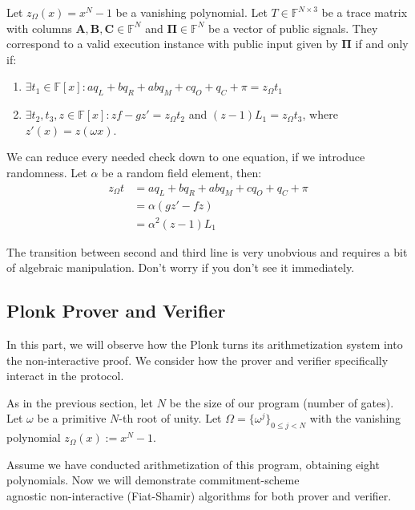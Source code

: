 \documentclass[../lecture-notes.tex]{subfiles}
\begin{document}
\begin{definition}
Let $z_{\Omega}(x) = x^N - 1$ be a vanishing polynomial. Let $T \in \mathbb{F}^{N
\times 3}$ be a trace matrix with columns $\mathbf{A}, \mathbf{B}, \mathbf{C}
\in \mathbb{F}^N$ and $\boldsymbol{\Pi} \in \mathbb{F}^N$ be a vector of public
signals. They correspond to a valid execution instance with public input given
by $\boldsymbol{\Pi}$ if and only if:

\begin{enumerate}
    \item \(\exists t_1 \in \mathbb{F}[x]: aq_L + bq_R + abq_M + cq_O + q_C + \pi = z_{\Omega}t_1\)
    \item \(\exists t_2, t_3, z \in \mathbb{F}[x]: zf - gz' = z_{\Omega}t_2\) and \((z-1)L_1 = z_{\Omega}t_3\), where $z'(x) = z(\omega x)$.
\end{enumerate}
\end{definition}
\begin{remark}
We can reduce every needed check down to one equation, if we introduce randomness.
Let $\alpha$ be a random field element, then: 
\[
    \begin{aligned}
        z_{\Omega}t &= aq_L + bq_R + abq_M + cq_O + q_C + \pi \\
        &= \alpha(gz' - fz) \\
        &= \alpha^2(z - 1)L_1
    \end{aligned}
\]

The transition between second and third line is very unobvious and requires a 
bit of algebraic manipulation. Don't worry if you don't see it immediately.
\end{remark}


\subsection{Plonk Prover and Verifier}

In this part, we will observe how the Plonk turns its arithmetization system
into the non-interactive proof. We consider how the prover and verifier specifically interact
in the protocol.

As in the previous section, let $N$ be the size of our program (number of
gates). Let $\omega$ be a primitive $N$-th root of unity. Let $\Omega =
\{\omega^j\}_{0 \leq j < N}$ with the vanishing polynomial $z_{\Omega}(x) := x^N
- 1$.

Assume we have conducted arithmetization of this program, obtaining eight
polynomials. Now we will demonstrate commitment-scheme \\
agnostic non-interactive (Fiat-Shamir) algorithms for both prover and verifier.
\end{document}
